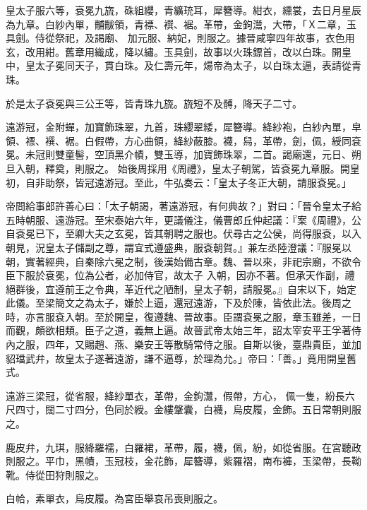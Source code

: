 \begin{pinyinscope}
 皇太子服六等，袞冕九旒，硃組纓，青纊珫耳，犀簪導。紺衣，纁裳，去日月星辰為九章。白紗內單，黼黻領，青褾、襈、裾。革帶，金鉤灊，大帶，「Ｘ二章，玉具劍。侍從祭祀，及謁廟、
 加元服、納妃，則服之。據晉咸寧四年故事，衣色用玄，改用紺。舊章用織成，降以繡。玉具劍，故事以火珠鏢首，改以白珠。開皇中，皇太子冕同天子，貫白珠。及仁壽元年，煬帝為太子，以白珠太逼，表請從青珠。



 於是太子袞冕與三公王等，皆青珠九旒。旒短不及髆，降天子二寸。



 遠游冠，金附蟬，加寶飾珠翠，九首，珠纓翠緌，犀簪導。絳紗袍，白紗內單，皁領、褾、襈、裾。白假帶，方心曲領，絳紗蔽膝。襪，舄，革帶，劍，佩，綬同袞冕。未冠則雙童髻，空頂黑介幘，雙玉導，加寶飾珠翠，二首。謁廟還，元日、朔旦入朝，釋奠，則服之。
 始後周採用《周禮》，皇太子朝駕，皆袞冕九章服。開皇初，自非助祭，皆冠遠游冠。至此，牛弘奏云：「皇太子冬正大朝，請服袞冕。」



 帝問給事郎許善心曰：「太子朝謁，著遠游冠，有何典故？」對曰：「晉令皇太子給五時朝服、遠游冠。至宋泰始六年，更議儀注，儀曹郎丘仲起議：『案《周禮》，公自袞冕已下，至卿大夫之玄冕，皆其朝聘之服也。伏尋古之公侯，尚得服袞，以入朝見，況皇太子儲副之尊，謂宜式遵盛典，服袞朝賀。』兼左丞陸澄議：『服冕以朝，實著經典，自秦除六冕之制，後漢始備古章。魏、晉以來，非祀宗廟，不欲令臣下服於袞冕，位為公者，必加侍官，故太子
 入朝，因亦不著。但承天作副，禮絕群後，宜遵前王之令典，革近代之陋制，皇太子朝，請服冕。』自宋以下，始定此儀。至梁簡文之為太子，嫌於上逼，還冠遠游，下及於陳，皆依此法。後周之時，亦言服袞入朝。至於開皇，復遵魏、晉故事。臣謂袞冕之服，章玉雖差，一日而觀，頗欲相類。臣子之道，義無上逼。故晉武帝太始三年，詔太宰安平王孚著侍內之服，四年，又賜趙、燕、樂安王等散騎常侍之服。自斯以後，臺鼎貴臣，並加貂璫武弁，故皇太子遂著遠游，謙不逼尊，於理為允。」帝曰：「善。」竟用開皇舊式。



 遠游三梁冠，從省服，絳紗單衣，革帶，金鉤灊，假帶，方心，
 佩一隻，紛長六尺四寸，闊二寸四分，色同於綬。金縷鞶囊，白襪，烏皮履，金飾。五日常朝則服之。



 鹿皮弁，九琪，服絳羅襦，白羅裙，革帶，履，襪，佩，紛，如從省服。在宮聽政則服之。平巾，黑幘，玉冠枝，金花飾，犀簪導，紫羅褶，南布褲，玉梁帶，長靿靴。侍從田狩則服之。



 白帢，素單衣，烏皮履。為宮臣舉哀吊喪則服之。




\end{pinyinscope}

